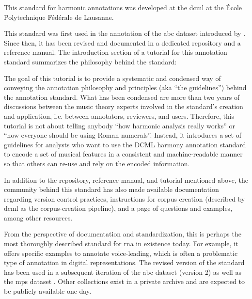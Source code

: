 

This standard for harmonic annotations was developed at the
\gls{dcml} at the \'Ecole Polytechnique F\'ed\'erale de
Lausanne.

This standard was first used in the annotation of the
\gls{abc} dataset introduced by
\textcite{neuwirth2018annotated}. Since then, it has been
revised and documented in a dedicated
repository
and a reference
manual.
The introduction section of a tutorial for this annotation
standard summarizes the philosophy behind the
standard:

\begin{italicsquote}
    The goal of this tutorial is to provide a systematic and
    condensed way of conveying the annotation philosophy and
    principles (aka ``the guidelines'') behind the
    annotation standard. What has been condensed are more
    than two years of discussions between the music theory
    experts involved in the standard's creation and
    application, i.e. between annotators, reviewers, and
    users. Therefore, this tutorial is not about telling
    anybody ``how harmonic analysis really works'' or ``how
    everyone should be using Roman numerals''. Instead, it
    introduces a set of guidelines for analysts who want to
    use the DCML harmony annotation standard to encode a set
    of musical features in a consistent and machine-readable
    manner so that others can re-use and rely on the encoded
    information.
\end{italicsquote}

In addition to the repository, reference manual, and
tutorial mentioned above, the community behind this standard
has also made available documentation regarding version
control
practices,
instructions for corpus creation (described by \gls{dcml} as
the corpus-creation
pipeline),
and a page of questions and
examples,
among other resources.

From the perspective of documentation and standardization,
this is perhaps the most thoroughly described standard for
\gls{rna} in existence today. For example, it offers
specific examples to annotate
voice-leading,
which is often a problematic type of annotation in digital
representations. The revised version of the standard has
been used in a subsequent iteration of the \gls{abc} dataset
(version 2) as well as the \gls{mps} dataset
\parencite{hentschel2021annotated}. Other collections exist
in a private archive and are expected to be publicly
available one day.
